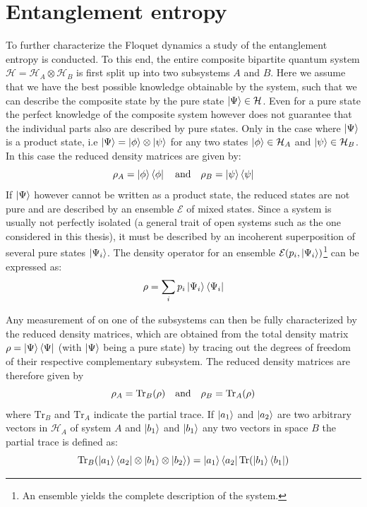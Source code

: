 \documentclass[11pt, a4paper, oneside]{book}
\theoremstyle{definition} %
\begin{document}
\section{Entanglement entropy}

To further characterize the Floquet dynamics a study of the entanglement entropy is conducted. To this end, the entire composite bipartite quantum system $\mathcal{H} = \mathcal{H}_A \otimes \mathcal{H}_B$ is first split up into two subsystems $A$ and $B$. Here we assume that we have the best possible knowledge obtainable by the system, such that we can describe the composite state by the pure state $\ket{\Psi} \in \mathcal{H}$. Even for a pure state the perfect knowledge of the composite system however does not guarantee that the individual parts also are described by pure states. Only in the case where $\ket{\Psi}$ is a product state, i.e $\ket{\Psi} = \ket{\phi} \otimes \ket{\psi}$ for any two states $\ket{\phi} \in \mathcal{H}_A$ and $\ket{\psi} \in \mathcal{H}_B$. In this case the reduced density matrices are given by:
\begin{equation}
	\rho_A = \ket{\phi}\bra{\phi} \qq{and} \rho_B = \ket{\psi}\bra{\psi}
\end{equation}
If $\ket{\Psi}$ however cannot be written as a product state, the reduced states are not pure and are described by an ensemble $\mathcal{E}$ of mixed states. Since a system is usually not perfectly isolated (a general trait of open systems such as the one considered in this thesis), it must be described by an incoherent superposition of several pure states $\ket{\Psi_i}$. The density operator for an ensemble $\mathcal{E}(p_i, \ket{\Psi_i})$\footnote{An ensemble yields the complete description of the system.} can be expressed as:
\begin{equation}
	\rho = \sum_i p_i \ket{\Psi_i} \bra{\Psi_i}
\end{equation}


Any measurement of on one of the subsystems can then be fully characterized by the reduced density matrices, which are obtained from the total density matrix $\rho = \ket{\Psi}\bra{\Psi}$ (with $\ket{\Psi}$ being a pure state) by tracing out the degrees of freedom of their respective complementary subsystem. The reduced density matrices are therefore given by
\begin{equation}
	\rho_A = \text{Tr}_B(\rho) \qq{and} \rho_B = \text{Tr}_A(\rho)
\end{equation}
where $\text{Tr}_B$ and $\text{Tr}_A$ indicate the partial trace. If $\ket{a_1}$ and $\ket{a_2}$ are two arbitrary vectors in $\mathcal{H}_A$ of system $A$ and $\ket{b_1}$ and $\ket{b_1}$ any two vectors in space $B$ the partial trace is defined as:
\begin{equation}
	\text{Tr}_B(\ket{a_1}\bra{a_2} \otimes \ket{b_1} \otimes \ket{b_2}) = \ket{a_1} \bra{a_2} \text{Tr}(\ket{b_1} \bra{b_1}) 
\end{equation}
\end{document}

